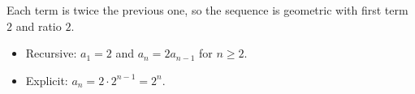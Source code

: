 Each term is twice the previous one, so the sequence is geometric with first term $2$ and ratio $2$.
\begin{itemize}
\item Recursive: $a_1=2$ and $a_n=2a_{n-1}$ for $n\ge2$.
\item Explicit: $a_n=2\cdot2^{n-1}=\boxed{2^n}$.
\end{itemize}
